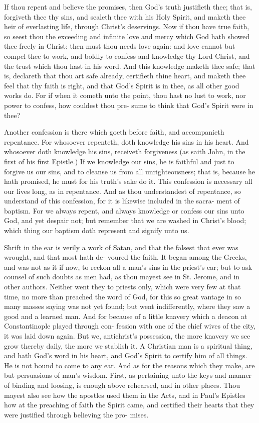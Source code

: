 \documentclass{custom}
\begin{document}
If thou repent and believe the promises, then God's 
truth justifieth thee; that is, forgiveth thee thy sins, and 
sealeth thee with his Holy Spirit, and maketh thee heir of 
everlasting life, through Christ's deservings. Now if thou 
have true faith, so seest thou the exceeding and infinite 
love and mercy which God hath showed thee freely in 
Christ: then must thou needs love again: and love 
cannot but compel thee to work, and boldly to confess and 
knowledge thy Lord Christ, and the trust which thou 
hast in his word. And this knowledge maketh thee safe; 
that is, declareth that thou art safe already, certifieth thine 
heart, and maketh thee feel that thy faith is right, and 
that God's Spirit is in thee, as all other good works do. 
For if when it cometh unto the point, thou hast no lust 
to work, nor power to confess, how couldest thou pre- 
sume to think that God's Spirit were in thee? 

Another confession is there which goeth before faith, 
and accompanieth repentance. For whosoever repenteth, 
doth knowledge his sins in his heart. And whosoever 
doth knowledge his sins, receiveth forgiveness (as saith 
John, in the first of his first Epistle.) If we knowledge 
our sins, he is faithful and just to forgive us our sins, and
to cleanse us from all unrighteousness; that is, because 
he hath promised, he must for his truth's sake do it. This 
confession is necessary all our lives long, as in repentance. 
And as thou understandest of repentance, so understand 
of this confession, for it is likewise included in the sacra- 
ment of baptism. For we always repent, and always 
knowledge or confess our sins unto God, and yet despair 
not; but remember that we are washed in Christ's blood;
which thing our baptism doth represent and signify 
unto us. 

Shrift in the ear is verily a work of Satan, and that the
falsest that ever was wrought, and that most hath de-
voured the faith. It began among the Greeks, and was
not as it if now, to reckon all a man's sins in the priest's
ear; but to ask counsel of such doubts as men had, as thou 
mayest see in St. Jerome, and in other authors. Neither 
went they to priests only, which were very few at that 
time, no more than preached the word of God, for this 
so great vantage in so many masses saying was not yet 
found; but went indifferently, where they saw a good and 
a learned man. And for because of a little knavery 
which a deacon at Constantinople played through con- 
fession with one of the chief wives of the city, it was laid 
down again. But we, antichrist's possession, the more 
knavery we see grow thereby daily, the more we stablish 
it. A Christian man is a spiritual thing, and hath God's 
word in his heart, and God's Spirit to certify him of all 
things. He is not bound to come to any ear. And as for 
the reasons which they make, are but persuasions of man's 
wisdom. First, as pertaining unto the keys and manner 
of binding and loosing, is enough above rehearsed, and in 
other places. Thou mayest also see how the apostles used 
them in the Acts, and in Paul's Epistles how at the
preaching of faith the Spirit came, and certified their
hearts that they were justified through believing the pro- 
mises. 
\end{document}
